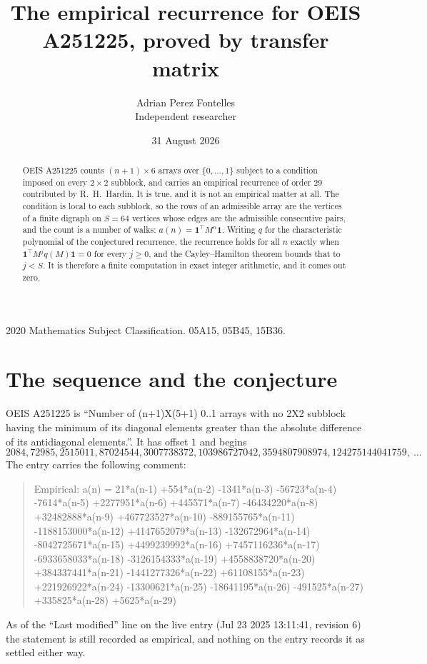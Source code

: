 \documentclass[11pt,a4paper]{article}
\title{The empirical recurrence for OEIS A251225, proved by transfer matrix}
\author{Adrian Perez Fontelles\\ \small Independent researcher}
\date{31 August 2026}
\theoremstyle{plain}
\theoremstyle{definition}
\begin{document}
\maketitle

\begin{abstract}
OEIS A251225 counts $(n+1)\times6$ arrays over $\{0,\dots,1\}$ subject to a condition imposed on
every $2\times2$ subblock, and carries an empirical recurrence of order $29$ contributed
by R.~H.~Hardin. It is true, and it is not an empirical matter at all. The condition is local
to each subblock, so the rows of an admissible array are the vertices of a finite digraph
on $S=64$ vertices whose edges are the admissible consecutive pairs, and the count is a
number of walks: $a(n)=\mathbf{1}^{\!\top}M^{n}\mathbf{1}$. Writing $q$
for the characteristic polynomial of the conjectured recurrence, the recurrence holds for all
$n$ exactly when $\mathbf{1}^{\!\top}M^{j}q(M)\mathbf{1}=0$ for every $j\ge0$, and the
Cayley--Hamilton theorem bounds that to $j<S$. It is therefore a finite computation in exact
integer arithmetic, and it comes out zero.
\end{abstract}

\noindent\small 2020 Mathematics Subject Classification. 05A15, 05B45, 15B36.\normalsize

\section{The sequence and the conjecture}

OEIS A251225 is ``Number of (n+1)X(5+1) 0..1 arrays with no 2X2 subblock having the minimum of its diagonal elements greater than the absolute difference of its antidiagonal elements.''. It has offset $1$ and begins
\[
2084, 72985, 2515011, 87024544, 3007738372, 103986727042, 3594807908974, 124275144041759,\ \dots
\]
The entry carries the following comment:
\begin{quote}\small
Empirical: a(n) = 21*a(n-1) +554*a(n-2) -1341*a(n-3) -56723*a(n-4) -7614*a(n-5) +2277951*a(n-6) +445571*a(n-7) -46434220*a(n-8) +32482888*a(n-9) +467723527*a(n-10) -889155765*a(n-11) -1188153000*a(n-12) +4147652079*a(n-13) -132672964*a(n-14) -8042725671*a(n-15) +4499239992*a(n-16) +7457116236*a(n-17) -6933658033*a(n-18) -3126154333*a(n-19) +4558838720*a(n-20) +384337441*a(n-21) -1441277326*a(n-22) +61108155*a(n-23) +221926922*a(n-24) -13300621*a(n-25) -18641195*a(n-26) -491525*a(n-27) +335825*a(n-28) +5625*a(n-29)
\end{quote}
As of the ``Last modified'' line on the live entry (Jul 23 2025 13:11:41, revision 6) the statement is
still recorded as empirical, and nothing on the entry records it as settled either way.
\end{document}
